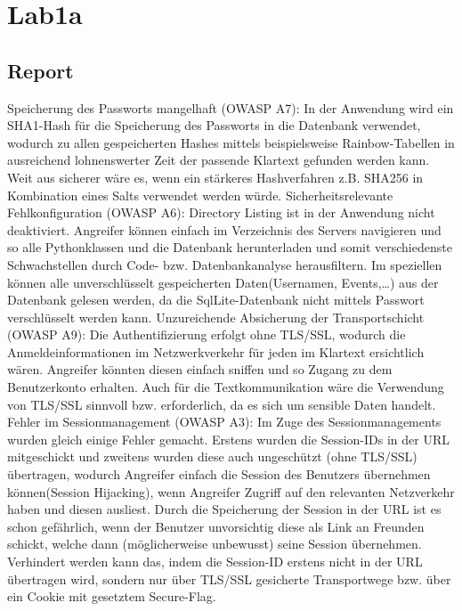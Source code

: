 \documentclass[12pt,a4paper,titlepage,oneside]{scrartcl}
\begin{document}
\maketitle
\setcounter{section}{0}
\setcounter{tocdepth}{2}
\tableofcontents

%
%

\section{Lab1a}

\subsection{Report}
Speicherung des Passworts mangelhaft (OWASP A7): 
In der Anwendung wird ein SHA1-Hash f\"ur die Speicherung des Passworts in die Datenbank verwendet, wodurch zu allen gespeicherten Hashes mittels beispielsweise Rainbow-Tabellen in ausreichend lohnenswerter Zeit der passende Klartext gefunden werden kann. Weit aus sicherer wäre es, wenn ein stärkeres Hashverfahren z.B. SHA256 in Kombination eines Salts verwendet werden würde.
\newline
\newline
Sicherheitsrelevante Fehlkonfiguration (OWASP A6):
Directory Listing ist in der Anwendung nicht deaktiviert. Angreifer können einfach im Verzeichnis des Servers navigieren und so alle Pythonklassen und die Datenbank herunterladen und somit verschiedenste Schwachstellen durch Code- bzw. Datenbankanalyse herausfiltern. Im speziellen können alle unverschlüsselt gespeicherten Daten(Usernamen, Events,…) aus der Datenbank gelesen werden, da die SqlLite-Datenbank nicht mittels Passwort verschlüsselt werden kann. 
\newline
\newline
Unzureichende Absicherung der Transportschicht (OWASP A9): 
Die Authentifizierung erfolgt ohne TLS/SSL, wodurch die Anmeldeinformationen im Netzwerkverkehr für jeden im Klartext ersichtlich wären. Angreifer könnten diesen einfach sniffen und so Zugang zu dem Benutzerkonto erhalten. Auch für die Textkommunikation wäre die Verwendung von TLS/SSL sinnvoll bzw. erforderlich, da es sich um sensible Daten handelt.
\newline
\newline
Fehler im Sessionmanagement (OWASP A3): 
Im Zuge des Sessionmanagements wurden gleich einige Fehler gemacht. Erstens wurden die Session-IDs in der URL mitgeschickt und zweitens wurden diese auch ungeschützt (ohne TLS/SSL) übertragen, wodurch Angreifer einfach die Session des Benutzers übernehmen können(Session Hijacking), wenn Angreifer Zugriff auf den relevanten Netzverkehr haben und diesen ausliest. Durch die Speicherung der Session in der URL ist es schon gefährlich, wenn der Benutzer unvorsichtig diese als Link an Freunden schickt, welche dann (möglicherweise unbewusst) seine Session übernehmen. Verhindert werden kann das, indem die Session-ID erstens nicht in der URL übertragen wird, sondern nur über TLS/SSL gesicherte Transportwege bzw. über ein Cookie mit gesetztem Secure-Flag. 
\end{document}
